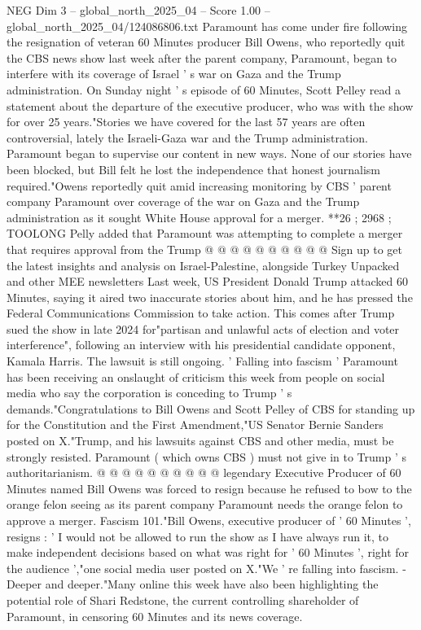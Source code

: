 \begin{textsample}{NEG Dim 3 – global\_north\_2025\_04 – Score 1.00 – global\_north\_2025\_04/124086806.txt}  \label{ex:f3_neg_414}
Paramount has come under fire following the resignation of veteran 60 Minutes producer Bill Owens, who reportedly quit the CBS news show last week after the parent company, Paramount, began to interfere with its coverage of Israel ' s war on Gaza and the Trump administration.
On Sunday night ' s episode of 60 Minutes, Scott Pelley read a statement about the departure of the executive producer, who was with the show for over 25 years."Stories we have covered for the last 57 years are often controversial, lately the Israeli-Gaza war and the Trump administration.
Paramount began to supervise our content in new ways.
None of our stories have been blocked, but Bill felt he lost the independence that honest journalism required."Owens reportedly quit amid increasing monitoring by CBS ' parent company Paramount over coverage of the war on Gaza and the Trump administration as it sought White House approval for a merger. **26 ; 2968 ; TOOLONG Pelly added that Paramount was attempting to complete a merger that requires approval from the Trump @ @ @ @ @ @ @ @ @ @ Sign up to get the latest insights and analysis on Israel-Palestine, alongside Turkey Unpacked and other MEE newsletters Last week, US President Donald Trump attacked 60 Minutes, saying it aired two inaccurate stories about him, and he has pressed the Federal Communications Commission to take action.
This comes after Trump sued the show in late 2024 for"partisan and unlawful acts of election and voter interference", following an interview with his presidential candidate opponent, Kamala Harris.
The lawsuit is still ongoing. ' Falling into fascism ' Paramount has been receiving an onslaught of criticism this week from people on social media who say the corporation is conceding to Trump ' s demands."Congratulations to Bill Owens and Scott Pelley of CBS for standing up for the Constitution and the First Amendment,"US Senator Bernie Sanders posted on X."Trump, and his lawsuits against CBS and other media, must be strongly resisted.
Paramount ( which owns CBS ) must not give in to Trump ' s authoritarianism. @ @ @ @ @ @ @ @ @ @ legendary Executive Producer of 60 Minutes named Bill Owens was forced to resign because he refused to bow to the orange felon seeing as its parent company Paramount needs the orange felon to approve a merger.
Fascism 101."Bill Owens, executive producer of ' 60 Minutes ', resigns : ' I would not be allowed to run the show as I have always run it, to make independent decisions based on what was right for ' 60 Minutes ', right for the audience ',"one social media user posted on X."We ' re falling into fascism. - Deeper and deeper."Many online this week have also been highlighting the potential role of Shari Redstone, the current controlling shareholder of Paramount, in censoring 60 Minutes and its news coverage.

\end{textsample}
